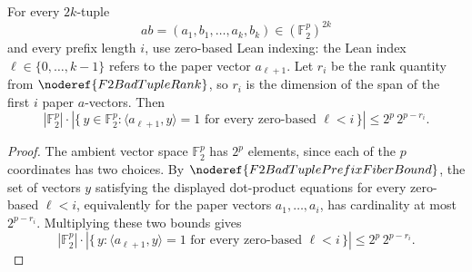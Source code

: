 \begin{helper}
For every \(2k\)-tuple
\[
  ab=(a_1,b_1,\ldots,a_k,b_k)\in(\mathbb F_2^p)^{2k}
\]
and every prefix length \(i\), use zero-based Lean indexing: the Lean index
\(\ell\in\{0,\ldots,k-1\}\) refers to the paper vector \(a_{\ell+1}\). Let
\(r_i\) be the rank quantity from \(\noderef{F2BadTupleRank}\), so \(r_i\) is
the dimension of the span of the first \(i\) paper \(a\)-vectors. Then
\[
  |\mathbb F_2^p|\cdot
  \left|\{\,y\in\mathbb F_2^p:\langle a_{\ell+1},y\rangle=1
      \text{ for every zero-based }\ell<i\,\}\right|
  \le
  2^p\,2^{p-r_i}.
\]
\end{helper}
\begin{proof}
The ambient vector space \(\mathbb F_2^p\) has \(2^p\) elements, since each of
the \(p\) coordinates has two choices. By
\(\noderef{F2BadTuplePrefixFiberBound}\), the set of vectors \(y\) satisfying
the displayed dot-product equations for every zero-based \(\ell<i\), equivalently
for the paper vectors \(a_1,\ldots,a_i\), has cardinality at most
\(2^{p-r_i}\).
Multiplying these two bounds gives
\[
  |\mathbb F_2^p|\cdot
  \left|\{\,y:\langle a_{\ell+1},y\rangle=1
      \text{ for every zero-based }\ell<i\,\}\right|
  \le 2^p\,2^{p-r_i}.
\]
\end{proof}

